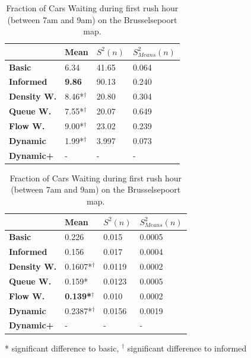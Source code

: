 \documentclass[11pt]{article}
\begin{document}
\begin{table}[H]
\centering
\caption{Average Velocity of Cars during first rush hour (between 7am and 9am) on the Brusselsepoort map.}
\label{tab:velo-morning-brussel}
\begin{tabular}{l|l|l|l|}
\textbf{}                 & \textbf{Mean} & \textbf{$S^2(n)$} & \textbf{$S_{Means}^2(n)$} \\
\hline\textbf{Basic}            & 6.34          & 41.65             & 0.064                      \\
\textbf{Informed}         & \textbf{9.86}          & 90.13             & 0.240                      \\
\hline\textbf{Density W.} & 8.46*$^\dagger$          & 20.80             & 0.304                      \\
\textbf{Queue W.}   & 7.55*$^\dagger$          & 20.07             & 0.649                      \\
\textbf{Flow W.}    & 9.00*$^\dagger$          & 23.02             & 0.239                      \\
\textbf{Dynamic}          & 1.99*$^\dagger$          & 3.997             & 0.073                      \\
\textbf{Dynamic+}         & -             & -                 & -                    
\end{tabular}
\vspace{20pt}
\centering
\caption{Fraction of Cars Waiting during first rush hour (between 7am and 9am) on the Brusselsepoort map.}
\label{tab:waiting-morning-brussel}
\begin{tabular}{l|l|l|l|}
\textbf{}                 & \textbf{Mean} & \textbf{$S^2(n)$} & \textbf{$S_{Means}^2(n)$} \\
\hline\textbf{Basic}      & 0.226          & 0.015             & 0.0005                     \\
\textbf{Informed}   & 0.156          & 0.017             & 0.0004                     \\
\hline\textbf{Density W.} & 0.1607*$^\dagger$         & 0.0119            & 0.0002                     \\
\textbf{Queue W.}   & 0.159*          & 0.0123            & 0.0005                     \\
\textbf{Flow W.}    & \textbf{0.139*$^\dagger$} & 0.010             & 0.0002                     \\
\textbf{Dynamic}    & 0.2387*$^\dagger$         & 0.0156            & 0.0019                     \\
\textbf{Dynamic+}   & -              & -                 & -                         
\end{tabular}

\small{* significant difference to basic, $^\dagger$ significant difference to informed}
\end{table}
\end{document}
